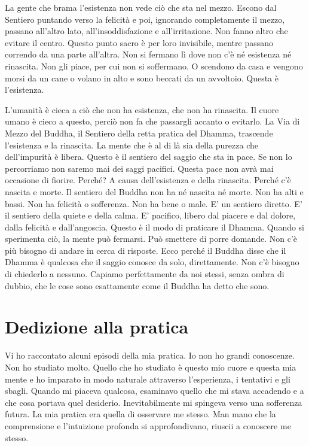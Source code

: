 La gente che brama l'esistenza non vede ciò che sta nel mezzo. Escono
dal Sentiero puntando verso la felicità e poi, ignorando completamente
il mezzo, passano all'altro lato, all'insoddisfazione e all'irritazione.
Non fanno altro che evitare il centro. Questo punto sacro è per loro
invisibile, mentre passano correndo da una parte all'altra. Non si
fermano lì dove non c'è né esistenza né rinascita. Non gli piace, per
cui non si soffermano. O scendono da casa e vengono morsi da un cane o
volano in alto e sono beccati da un avvoltoio. Questa è l'esistenza.

L'umanità è cieca a ciò che non ha esistenza, che non ha rinascita. Il
cuore umano è cieco a questo, perciò non fa che passargli accanto o
evitarlo. La Via di Mezzo del Buddha, il Sentiero della retta pratica
del Dhamma, trascende l'esistenza e la rinascita. La mente che è al di
là sia della purezza che dell'impurità è libera. Questo è il sentiero
del saggio che sta in pace. Se non lo percorriamo non saremo mai dei
saggi pacifici. Questa pace non avrà mai occasione di fiorire. Perché? A
causa dell'esistenza e della rinascita. Perché c'è nascita e morte. Il
sentiero del Buddha non ha né nascita né morte. Non ha alti e bassi. Non
ha felicità o sofferenza. Non ha bene o male. E' un sentiero diretto. E'
il sentiero della quiete e della calma. E' pacifico, libero dal piacere
e dal dolore, dalla felicità e dall'angoscia. Questo è il modo di
praticare il Dhamma. Quando si sperimenta ciò, la mente può fermarsi.
Può smettere di porre domande. Non c'è più bisogno di andare in cerca di
risposte. Ecco perché il Buddha disse che il Dhamma è qualcosa che il
saggio conosce da solo, direttamente. Non c'è bisogno di chiederlo a
nessuno. Capiamo perfettamente da noi stessi, senza ombra di dubbio, che
le cose sono esattamente come il Buddha ha detto che sono.

\section{Dedizione alla pratica}

Vi ho raccontato alcuni episodi della mia pratica. Io non ho grandi
conoscenze. Non ho studiato molto. Quello che ho studiato è questo mio
cuore e questa mia mente e ho imparato in modo naturale attraverso
l'esperienza, i tentativi e gli sbagli. Quando mi piaceva qualcosa,
esaminavo quello che mi stava accadendo e a che cosa portava quel
desiderio. Inevitabilmente mi spingeva verso una sofferenza futura. La
mia pratica era quella di osservare me stesso. Man mano che la
comprensione e l'intuizione profonda si approfondivano, riuscii a
conoscere me stesso.

